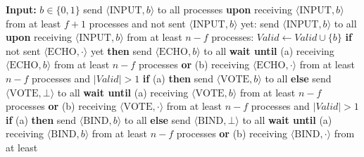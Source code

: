 \begin{algorithm}
    \caption{Implementation of GBCA. Algorithm 6 of Abraham, Ben-David and
      Yandamuri \cite{ABDY22}, transcribed in full: six rounds, the message
      levels INPUT, ECHO, VOTE, BIND, SEAL, and that algorithm's three decide
      conditions (D18). The source blueprint's own GBCA pseudocode is a
      four-round compression of this one --- the SEAL level elided, the decide
      conditions read one level down, and $f{+}1$ VOTE-$b$ receipts in place of
      $f{+}1$ BIND-$b$ receipts as the grade-1 witness --- and that compression
      violates Binding, so the encoding follows the cited algorithm instead}
    \label{alg:gbca-impl}
    \begin{algorithmic}
        \State \textbf{Input:} $b \in \{0,1\}$
        \medskip
        \State send $\langle\mathrm{INPUT}, b\rangle$ to all processes
        \State \textbf{upon} receiving $\langle\mathrm{INPUT}, b\rangle$ from at
          least $f + 1$ processes and not sent $\langle\mathrm{INPUT}, b\rangle$ yet:
        \State\quad send $\langle\mathrm{INPUT}, b\rangle$ to all
        \State \textbf{upon} receiving $\langle\mathrm{INPUT}, b\rangle$ from at
          least $n - f$ processes:
        \State\quad $\mathit{Valid} \gets \mathit{Valid} \cup \{b\}$
        \State\quad \textbf{if} not sent $\langle\mathrm{ECHO}, \cdot\rangle$ yet
          \textbf{then} send $\langle\mathrm{ECHO}, b\rangle$ to all
        \State \textbf{wait until}
        \State\quad (a) receiving $\langle\mathrm{ECHO}, b\rangle$ from at least
          $n - f$ processes \textbf{or}
        \State\quad (b) receiving $\langle\mathrm{ECHO}, \cdot\rangle$ from at least
          $n - f$ processes and $|\mathit{Valid}| > 1$
        \State\quad \textbf{if} (a) \textbf{then} send $\langle\mathrm{VOTE}, b\rangle$
          to all \textbf{else} send $\langle\mathrm{VOTE}, \bot\rangle$ to all
        \State \textbf{wait until}
        \State\quad (a) receiving $\langle\mathrm{VOTE}, b\rangle$ from at least
          $n - f$ processes \textbf{or}
        \State\quad (b) receiving $\langle\mathrm{VOTE}, \cdot\rangle$ from at least
          $n - f$ processes and $|\mathit{Valid}| > 1$
        \State\quad \textbf{if} (a) \textbf{then} send $\langle\mathrm{BIND}, b\rangle$
          to all \textbf{else} send $\langle\mathrm{BIND}, \bot\rangle$ to all
        \State \textbf{wait until}
        \State\quad (a) receiving $\langle\mathrm{BIND}, b\rangle$ from at least
          $n - f$ processes \textbf{or}
        \State\quad (b) receiving $\langle\mathrm{BIND}, \cdot\rangle$ from at least

\end{algorithmic}
\end{algorithm}
